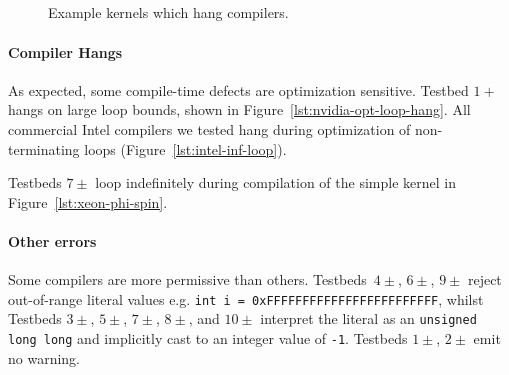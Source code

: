 \begin{figure}
  \centering %
  \\%
  \\%
  \\%
  \\%
  \caption{Example kernels which hang compilers.}%
  \vspace{-1.3em}
  \label{lst:compiler-hangs}%
\end{figure}

\paragraph{Compiler Hangs}

As expected, some compile-time defects are optimization sensitive. Testbed $1+$
hangs on large loop bounds, shown in Figure~\ref{lst:nvidia-opt-loop-hang}. All
commercial Intel compilers we tested hang during optimization of non-terminating
loops (Figure~\ref{lst:intel-inf-loop}).

Testbeds $7\pm$ loop indefinitely during compilation of the simple kernel in
Figure~\ref{lst:xeon-phi-spin}.

\paragraph{Other errors}

Some compilers are more permissive than others. Testbeds~$4\pm$, $6\pm$, $9\pm$
reject out-of-range literal values e.g. \texttt{int i =
0xFFFFFFFFFFFFFFFFFFFFFFFF}, whilst Testbeds $3\pm$, $5\pm$, $7\pm$, $8\pm$, and
$10\pm$ interpret the literal as an \texttt{unsigned long long} and implicitly
cast to an integer value of \texttt{-1}. Testbeds $1\pm$, $2\pm$ emit no
warning.

